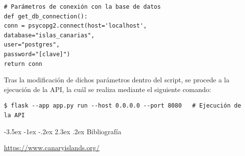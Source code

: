 \documentclass[11pt]{report}
\makeatletter
\renewcommand\chapter{\@startsection{chapter}{0}{\z@}%
    {-3.5ex \@plus -1ex \@minus -.2ex}%
    {2.3ex \@plus.2ex}%
    {\normalfont\Large\bfseries}}
\makeatother
\begin{document}
\begin{verbatim}
# Parámetros de conexión con la base de datos
def get_db_connection():
conn = psycopg2.connect(host='localhost',
database="islas_canarias",
user="postgres",
password="[clave]")
return conn
\end{verbatim}

Tras la modificación de dichos parámetros dentro del script, se procede a la ejecución de la API, la cuál se realiza mediante el siguiente comando:

\begin{verbatim}
$ flask --app app.py run --host 0.0.0.0 --port 8080   # Ejecución de la API
\end{verbatim}

\chapter{Bibliografía}
\begin{thebibliography}{99}
       \url{https://www.canaryislands.org/}

\end{thebibliography}
\end{document}
